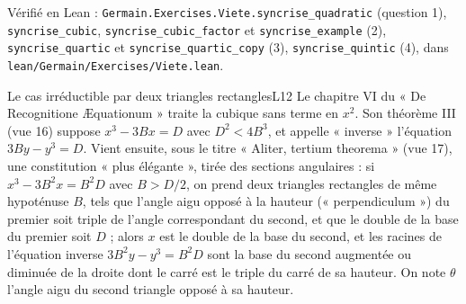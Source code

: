 \documentclass[11pt,a4paper]{article}
\begin{document}
\begin{solution}
Vérifié en Lean : \texttt{Germain.Exercises.Viete.syncrise\_quadratic} (question 1),
\texttt{syncrise\_cubic}, \texttt{syncrise\_cubic\_factor} et \texttt{syncrise\_example} (2),
\texttt{syncrise\_quartic} et \texttt{syncrise\_quartic\_copy} (3), \texttt{syncrise\_quintic} (4),
dans \texttt{lean/Germain/Exercises/Viete.lean}.
\end{solution}

\begin{exercice}{Le cas irréductible par deux triangles rectangles}{L1}{2}
Le chapitre VI du « De Recognitione Æquationum » traite la cubique sans terme en
$x^2$. Son théorème III (vue 16) suppose $x^3 - 3Bx = D$ avec $D^2 < 4B^3$, et
appelle « inverse » l'équation $3By - y^3 = D$. Vient ensuite, sous le titre
« Aliter, tertium theorema » (vue 17), une constitution « plus élégante », tirée
des sections angulaires : si $x^3 - 3B^2x = B^2D$ avec $B > D/2$, on prend deux
triangles rectangles de même hypoténuse $B$, tels que l'angle aigu opposé à la
hauteur (« perpendiculum ») du premier soit triple de l'angle correspondant du
second, et que le double de la base du premier soit $D$ ; alors $x$ est le double
de la base du second, et les racines de l'équation inverse
$3B^2y - y^3 = B^2D$ sont la base du second augmentée ou diminuée de la droite
dont le carré est le triple du carré de sa hauteur. On note $\theta$ l'angle aigu
du second triangle opposé à sa hauteur.



\end{exercice}
\end{document}
